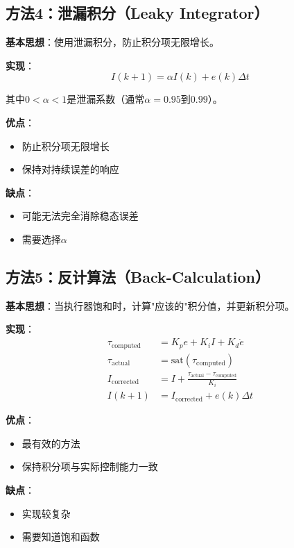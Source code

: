 \documentclass[12pt,a4paper]{article}
\begin{document}
\subsection{方法4：泄漏积分（Leaky Integrator）}

\textbf{基本思想}：使用泄漏积分，防止积分项无限增长。

\textbf{实现}：
\begin{equation}
I(k+1) = \alpha I(k) + e(k) \Delta t
\end{equation}

其中$0 < \alpha < 1$是泄漏系数（通常$\alpha = 0.95$到$0.99$）。

\textbf{优点}：
\begin{itemize}
\item 防止积分项无限增长
\item 保持对持续误差的响应
\end{itemize}

\textbf{缺点}：
\begin{itemize}
\item 可能无法完全消除稳态误差
\item 需要选择$\alpha$
\end{itemize}

\subsection{方法5：反计算法（Back-Calculation）}

\textbf{基本思想}：当执行器饱和时，计算"应该的"积分值，并更新积分项。

\textbf{实现}：
\begin{align}
\tau_{\text{computed}} &= K_p e + K_i I + K_d \dot{e} \\
\tau_{\text{actual}} &= \text{sat}(\tau_{\text{computed}}) \\
I_{\text{corrected}} &= I + \frac{\tau_{\text{actual}} - \tau_{\text{computed}}}{K_i} \\
I(k+1) &= I_{\text{corrected}} + e(k) \Delta t
\end{align}

\textbf{优点}：
\begin{itemize}
\item 最有效的方法
\item 保持积分项与实际控制能力一致
\end{itemize}

\textbf{缺点}：
\begin{itemize}
\item 实现较复杂
\item 需要知道饱和函数
\end{itemize}
\end{document}
